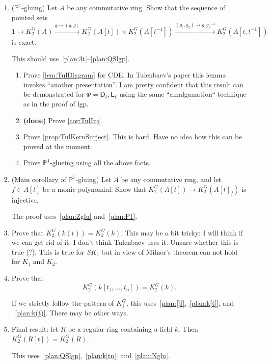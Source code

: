 \documentclass[oneside,12pt]{amsart}
\numberwithin{equation}{section}
\numberwithin{lem}{section}
\theoremstyle{definition}
\theoremstyle{remark}
\DeclareMathOperator{\St}{St^G}
\newcommand{\Pro}{\mathbb{P}}
\newcommand{\st}{\scriptstyle}
\newcommand{\rD}{\mathsf{D}}
\newcommand{\rE}{\mathsf{E}}
\begin{document}
\begin{enumerate}
(i) If $Ah+B=A$, i.e. the natural map $B\to A/Ah$ is surjective, then for any $x\in \St(A_h)$ there exist
$y\in \St(A)$ and $z\in \St(B_h)$ such that
$x=F_h(y)z$.

(ii) If moreover $Ah\cap B=Bh$, i.e. $B/Bh\to A/Ah$ is an isomorphism, and $h$ is not a zero divisor in $A$, then
the sequence of pointed sets
$$
K_2^G(B)\xrightarrow{\st g\mapsto (F_h(g),g)} K_2^G(B_h)\times K_2^G(A)\xrightarrow{\st (g_1,g_2)\mapsto g_1F_h(g_2)^{-1}}
K_2^G(A_h)
$$
is exact.

This should use something from the proof of~\eqref{plan:QSlgp} or~\eqref{plan:Zglu}; see~\cite[Lemma 3.4]{St-poly}.

\item\label{plan:P1} ($\Pro^1$-gluing) Let $A$ be any commutative ring. Show that the sequence of pointed sets
$$
1\longrightarrow K_2^G(A)\xrightarrow{\st g\mapsto (g,g)} K_2^G(A[t])\times K_2^G(A[t^{-1}])
\xrightarrow{\st (g_1,g_2)\mapsto g_1{g_2}^{-1}} K_2^G(A[t,t^{-1}])
$$
is exact.

This should use~\eqref{plan:3t}--\eqref{plan:QSlgp}.

\begin{enumerate}
 \item Prove \cref{lem:TulDiagram} for CDE. In Tulenbaev's paper this lemma invokes ``another presentation''.
  I am pretty confident that this result can be demonstrated for $\Phi=\rD_\ell, \rE_\ell$ using the same ``amalgamation`` technique as in the proof of lgp. 
 \item {\bf (done)} Prove \cref{cor:TulInj}.
 \item Prove \cref{prop:TulKernSurject}. This is hard. Have no idea how this can be proved at the moment. 
 \item Prove $\Pro^1$-glueing using all the above facts.
\end{enumerate}

\item\label{plan:[]f} (Main corollary of $\Pro^1$-gluing) Let $A$ be any commutative ring, and let $f\in A[t]$ be a monic polynomial. Show that
$K_2^G(A[t])\to K_2^G(A[t]_f)$ is injective.

The proof uses~\eqref{plan:Zglu} and~\eqref{plan:P1}.

\item\label{plan:k(t)} Prove that $K_2^G(k(t))=K_2^G(k)$. This may be a bit tricky; I will think if we can get rid of it. I don't think Tulenbaev uses it.
Unsure whether this is true (?). This is true for $SK_1$ but in view of Milnor's theorem can not hold for $K_1$ and $K_2$.

\item\label{plan:k[tn]} Prove that
$$K_2^G(k[t_1,\ldots,t_n])=K_2^G(k).$$

If we strictly follow the pattern of $K_1^G$, this uses~\eqref{plan:[]f},~\eqref{plan:k[t]}, and
~\eqref{plan:k(t)}. There may be other ways.

\item \label{plan:final} Final result: let $R$ be a regular ring containing a field $k$. Then $K_2^G(R[t])=K_2^G(R)$.

This uses~\eqref{plan:QSlgp},~\eqref{plan:k[tn]} and~\eqref{plan:Nglu}.
\end{enumerate}
\end{document}
